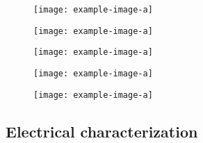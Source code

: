 \begin{figure}[h]
\centering
\begin{minipage}{0.28\textwidth}         %
  \centering
  \texttt{[image: example-image-a]}
  \label{fig: style 2 image f}
\end{minipage}
\end{figure}

\vspace{-5mm}
\begin{figure}[h]
\centering
\begin{minipage}{0.28\textwidth}
  \centering
  \texttt{[image: example-image-a]}
  \label{fig:defect liftoff}
\end{minipage}
\hfill
\begin{minipage}{0.28\textwidth}         %
  \centering
  \texttt{[image: example-image-a]}
  \label{fig: style 2 image d}
\end{minipage}
\hfill
\begin{minipage}{0.28\textwidth}
  \centering
  \texttt{[image: example-image-a]}
  \label{fig: style 2 image e}
\end{minipage}
\end{figure}

\vspace{-5mm}

\begin{figure}[h]
\centering
\begin{minipage}{0.28\textwidth}
  \centering
  \texttt{[image: example-image-a]}
  \label{fig: style 2 image g}
\end{minipage}
\end{figure}


\subsection*{Electrical characterization}

